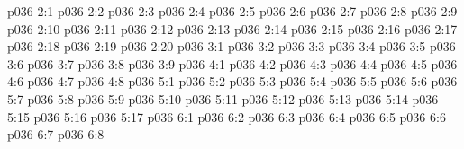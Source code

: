 \vs p036 2:1 
\vs p036 2:2 
\vs p036 2:3 
\vs p036 2:4 
\vs p036 2:5 
\vs p036 2:6 
\vs p036 2:7 
\vs p036 2:8 
\vs p036 2:9 \pc 
\vs p036 2:10 \pc 
\vs p036 2:11 
\vs p036 2:12 \pc 
\vs p036 2:13 
\vs p036 2:14 
\vs p036 2:15 
\vs p036 2:16 \pc 
\vs p036 2:17 \pc 
\vs p036 2:18 \pc 
\vs p036 2:19 \pc 
\vs p036 2:20 \pc 
{}
\vs p036 3:1 
\vs p036 3:2 
\vs p036 3:3 
\vs p036 3:4 \pc 
\vs p036 3:5 \pc 
\vs p036 3:6 \pc 
\vs p036 3:7 
\vs p036 3:8 
\vs p036 3:9 
\vs p036 4:1 
\vs p036 4:2 
\vs p036 4:3 
\vs p036 4:4 
\vs p036 4:5 \pc 
\vs p036 4:6 
\vs p036 4:7 
\vs p036 4:8 \pc 
{}
\vs p036 5:1 
\vs p036 5:2 
\vs p036 5:3 
\vs p036 5:4 \pc 
\vs p036 5:5 
\vs p036 5:6 
\vs p036 5:7 
\vs p036 5:8 
\vs p036 5:9 
\vs p036 5:10 
\vs p036 5:11 
\vs p036 5:12 
\vs p036 5:13 \pc 
\vs p036 5:14 
\vs p036 5:15 
\vs p036 5:16 
\vs p036 5:17 \pc 
{}
\vs p036 6:1 
\vs p036 6:2 
\vs p036 6:3 
\vs p036 6:4 \pc 
\vs p036 6:5 
\vs p036 6:6 \pc 
\vs p036 6:7 \pc 
\vsetoff
\vs p036 6:8 
\quizlink
